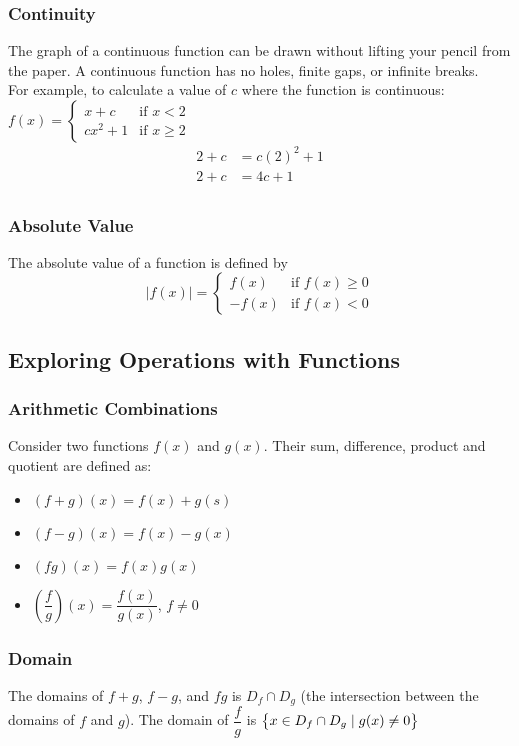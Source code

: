 \documentclass{article}
\begin{document}
	\subsubsection{Continuity}
	The graph of a continuous function can be drawn without lifting your pencil from the paper. A continuous function has no holes, finite gaps, or infinite breaks.\\
	For example, to calculate a value of $c$ where the function is continuous: $f(x)=\begin{cases}
		x+c&\text{if }x<2\\
		cx^2+1&\text{if }x\geq2
	\end{cases}$
	\begin{align}
		2+c&=c(2)^2+1\\
		2+c&=4c+1\\
	\end{align}
	\subsubsection{Absolute Value}
	The absolute value of a function is defined by
	\[|f(x)|=\begin{cases}
		f(x)&\text{if }f(x)\geq0\\
		-f(x)&\text{if }f(x)<0
	\end{cases}\]
	\subsection{Exploring Operations with Functions}
	\subsubsection{Arithmetic Combinations}
	Consider two functions $f(x)$ and $g(x)$. Their sum, difference, product and quotient are defined as:
	\begin{itemize}
		\item $(f+g)(x)=f(x)+g(s)$
		\item $(f-g)(x)=f(x)-g(x)$
		\item $(fg)(x)=f(x)g(x)$
		\item $\left(\dfrac{f}{g}\right)(x)=\dfrac{f(x)}{g(x)}$, $f\neq0$
	\end{itemize}
	\subsubsection{Domain}
	The domains of $f+g$, $f-g$, and $fg$ is $D_f\cap D_g$ (the intersection between the domains of $f$ and $g$). The domain of $\dfrac{f}{g}$ is $\set{x\in D_f\cap D_g\mid g(x)\neq0}$
	\setcounter{section}{9}
	\setcounter{subsection}{1}
\end{document}
